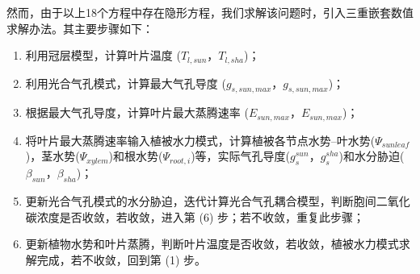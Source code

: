 然而，由于以上18个方程中存在隐形方程，我们求解该问题时，引入三重嵌套数值求解办法。其主要步骤如下：
\begin{enumerate}
    \item 利用冠层模型，计算叶片温度 ($T_{l,sun}$，$T_{l,sha}$)；
    \item 利用光合气孔模式，计算最大气孔导度 ($g_{s,sun,max}$，$g_{s,sun,max}$)；
    \item 根据最大气孔导度，计算叶片最大蒸腾速率 ($E_{sun,max}$，$E_{sun,max}$)；
    \item 将叶片最大蒸腾速率输入植被水力模式，计算植被各节点水势--叶水势($\Psi_{sunleaf}$)，茎水势($\Psi_{xylem}$)和根水势($\Psi_{root,i}$)等，实际气孔导度($g_{s}^{sun}$，$g_{s}^{sha}$)和水分胁迫($\beta_{sun}$，$\beta_{sha}$)；
    \item 更新光合气孔模式的水分胁迫，迭代计算光合气孔耦合模型，判断胞间二氧化碳浓度是否收敛，若收敛，进入第 (6) 步；若不收敛，重复此步骤；
    \item 更新植物水势和叶片蒸腾，判断叶片温度是否收敛，若收敛，植被水力模式求解完成，若不收敛，回到第 (1) 步。
\end{enumerate}



